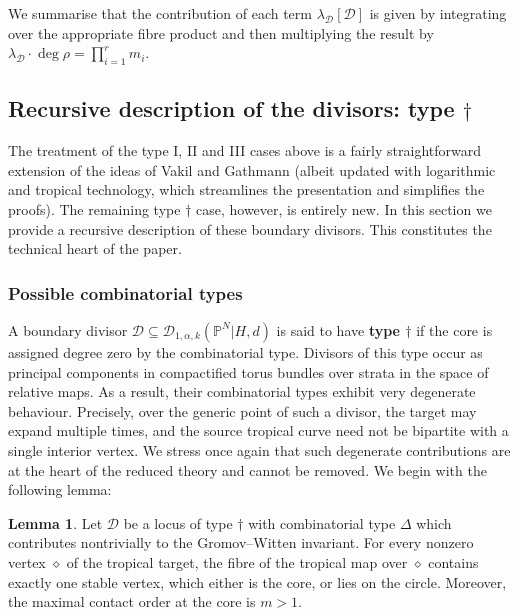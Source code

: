 \documentclass[11pt]{amsart}
\newcommand{\PP}{\mathbb P}
\newcommand{\Dcal}{\mathcal{D}}
\theoremstyle{definition}
\newtheorem{lemma}[thm]{Lemma}
\theoremstyle{definition}
\begin{document}
We summarise that the contribution of each term $\lambda_\Dcal [\Dcal]$ is given by integrating over the appropriate fibre product and then multiplying the result by $\lambda_\Dcal \cdot \deg\rho = \prod_{i=1}^r m_i$.

\subsection{Recursive description of the divisors: type $\dag$}\label{subsection C0 splitting} The treatment of the type I, II and III cases above is a fairly straightforward extension of the ideas of Vakil and Gathmann (albeit updated with logarithmic and tropical technology, which streamlines the presentation and simplifies the proofs). The remaining type $\dag$ case, however, is entirely new. In this section we provide a recursive description of these boundary divisors. This constitutes the technical heart of the paper.

\subsubsection{Possible combinatorial types} A boundary divisor $\Dcal \subseteq \Dcal_{1,\alpha,k}(\PP^N|H,d)$ is said to have \textbf{type $\dag$} if the core is assigned degree zero by the combinatorial type. Divisors of this type occur as principal components in compactified torus bundles over strata in the space of relative maps. As a result, their combinatorial types exhibit very degenerate behaviour. Precisely, over the generic point of such a divisor, the target may expand multiple times, and the source tropical curve need not be bipartite with a single interior vertex. We stress once again that such degenerate contributions are at the heart of the reduced theory and cannot be removed.  We begin with the following lemma:
\begin{lemma} \label{lemma type C0 combinatorial types}
Let $\Dcal$ be a locus of type $\dag$ with combinatorial type $\Delta$ which contributes nontrivially to the Gromov--Witten invariant. For every nonzero vertex $\diamond$ of the tropical target, the fibre of the tropical map over $\diamond$ contains exactly one stable vertex, which either is the core, or lies on the circle. Moreover, the maximal contact order at the core is $m>1$.
\end{lemma}
\end{document}

